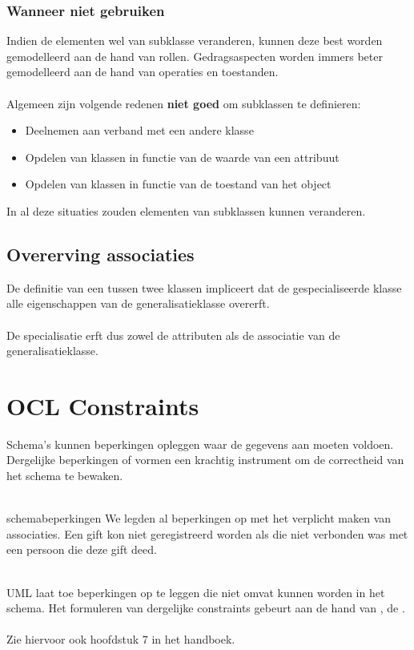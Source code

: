 \documentclass[../main.tex]{subfiles}
\begin{document}
\subsubsection{Wanneer niet gebruiken}
Indien de elementen wel van subklasse veranderen, kunnen deze best worden gemodelleerd aan de hand van rollen. Gedragsaspecten worden immers beter gemodelleerd aan de hand van operaties en toestanden.
\\\\
Algemeen zijn volgende redenen \textbf{niet goed} om subklassen te definieren:
\begin{itemize}
	\item Deelnemen aan verband met een andere klasse
	\item Opdelen van klassen in functie van de waarde van een attribuut
	\item Opdelen van klassen in functie van de toestand van het object
\end{itemize}
In al deze situaties zouden elementen van subklassen kunnen veranderen.
\subsection{Overerving associaties}
De definitie van een  tussen twee klassen impliceert dat de gespecialiseerde klasse alle eigenschappen van de generalisatieklasse overerft.\\
\\
De specialisatie erft dus zowel de attributen als de associatie van de generalisatieklasse.
\section{OCL Constraints}
Schema's kunnen beperkingen opleggen waar de gegevens aan moeten voldoen.  Dergelijke beperkingen of  vormen een krachtig instrument om de correctheid van het schema te bewaken.
\\\\
\noindent
\begin{ex}{schemabeperkingen}
We legden al beperkingen op met het verplicht maken van associaties. Een gift kon niet geregistreerd worden als die niet verbonden was met een persoon die deze gift deed.
\end{ex}
\\
UML laat toe beperkingen op te leggen die niet omvat kunnen worden in het schema. Het formuleren van dergelijke constraints gebeurt aan de hand van , de .\\
\\
Zie hiervoor ook  hoofdstuk 7 in het handboek.\\
\end{document}
